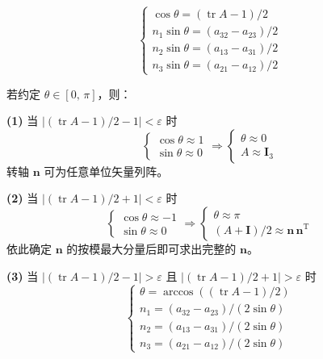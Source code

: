 \begin{equation}\label{eq:5.extract}
\begin{cases}
\cos\theta = (\operatorname{tr} A - 1) / 2 \\
n_1 \sin\theta = (a_{32} - a_{23}) / 2 \\
n_2 \sin\theta = (a_{13} - a_{31}) / 2 \\
n_3 \sin\theta = (a_{21} - a_{12}) / 2
\end{cases}
\end{equation}

若约定 $\theta \in [0,\, \pi]$，则：

\textbf{(1)} 当 $\left|(\operatorname{tr} A - 1)/2 - 1\right| < \varepsilon$ 时
\begin{equation*}
\begin{cases}
\cos\theta \approx 1 \\
\sin\theta \approx 0
\end{cases}
\Rightarrow
\begin{cases}
\theta \approx 0 \\
A \approx \boldsymbol{I}_3
\end{cases}
\end{equation*}
转轴 $\boldsymbol{n}$ 可为任意单位矢量列阵。

\textbf{(2)} 当 $\left|(\operatorname{tr} A - 1)/2 + 1\right| < \varepsilon$ 时
\begin{equation*}
\begin{cases}
\cos\theta \approx -1 \\
\sin\theta \approx 0
\end{cases}
\Rightarrow
\begin{cases}
\theta \approx \pi \\
(A + \boldsymbol{I}) / 2 \approx \boldsymbol{n}\, \boldsymbol{n}^{\mathrm{T}}
\end{cases}
\end{equation*}
依此确定 $\boldsymbol{n}$ 的按模最大分量后即可求出完整的 $\boldsymbol{n}$。

\textbf{(3)} 当 $\left|(\operatorname{tr} A - 1)/2 - 1\right| > \varepsilon$ 且 $\left|(\operatorname{tr} A - 1)/2 + 1\right| > \varepsilon$ 时
\begin{equation}
\begin{cases}
\theta = \arccos\!\left((\operatorname{tr} A - 1) / 2\right) \\
n_1 = (a_{32} - a_{23}) / (2 \sin\theta) \\
n_2 = (a_{13} - a_{31}) / (2 \sin\theta) \\
n_3 = (a_{21} - a_{12}) / (2 \sin\theta)
\end{cases}
\end{equation}

